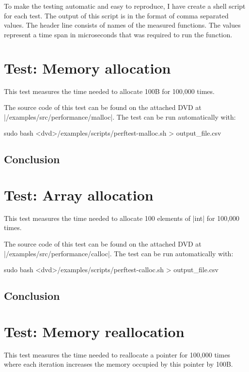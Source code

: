 To make the testing automatic and easy to reproduce, I have create a shell
script for each test. The output of this script is in the format of comma
separated values. The header line consists of names of the measured functions.
The values represent a time span in microseconds that was required to run the
function.

\section{Test: Memory allocation}

This test measures the time needed to allocate 100B for 100,000 times.

\funclistend
The source code of this test can be found on the attached DVD at
|/examples/src/performance/malloc|. The test can be run automatically with:
\begin{commandline}
sudo bash <dvd>/examples/scripts/perftest-malloc.sh > output_file.csv
\end{commandline}

\subsection{Conclusion}

\section{Test: Array allocation}

This test measures the time needed to allocate 100 elements of |int| for 100,000
times.

\funclistend
The source code of this test can be found on the attached DVD at
|/examples/src/performance/calloc|. The test can be run automatically with:
\begin{commandline}
sudo bash <dvd>/examples/scripts/perftest-calloc.sh > output_file.csv
\end{commandline}

\subsection{Conclusion}

\section{Test: Memory reallocation}

This test measures the time needed to reallocate a pointer for 100,000 times
where each iteration increases the memory occupied by this pointer by 100B.

